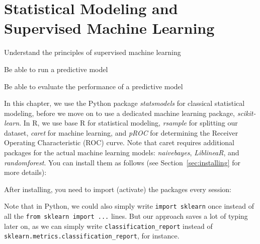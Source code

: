 \chapter{Statistical Modeling and Supervised Machine Learning}
\label{chap:introsml}

\begin{abstract}{Abstract} This chapter introduces the reader to the world of supervised machine learning. It starts by outlining how classical statistical techniques such as regression models can be used for prediction. It then provides an overview of frequently-used techniques from Na\"ive Bayes classifiers to neural networks.
\end{abstract}



\begin{objectives}
\item Understand the principles of supervised machine learning
\item Be able to run a predictive model
\item Be able to evaluate the performance of a predictive model
\end{objectives}

\newpage
\begin{feature}
In this chapter, we use the Python package \emph{statsmodels} for classical statistical modeling, before we move on to use a dedicated machine learning package, \emph{scikit-learn}. In R, we use base R for statistical modeling, \emph{rsample} for splitting our dataset, \emph{caret} for machine learning, and \emph{pROC} for determining the Receiver Operating Characteristic (ROC) curve. Note that caret requires additional packages for the actual machine learning models: \emph{naivebayes}, \emph{LiblineaR}, and \emph{randomforest}. You can install them as follows (see Section~\ref{sec:installing} for more details):


\noindent After installing, you need to import (activate) the packages every session:


Note that in Python, we could also simply write \verb|import sklearn| once instead of all the \verb|from sklearn import ...| lines.
But our approach saves a lot of typing later on, as we can simply write \verb|classification_report|
instead of \verb|sklearn.metrics.classification_report|, for instance.
\end{feature}





